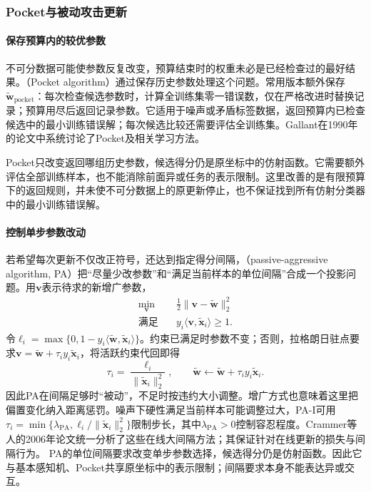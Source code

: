 \subsubsection{Pocket与被动攻击更新}

\paragraph{保存预算内的较优参数}
不可分数据可能使参数反复改变，预算结束时的权重未必是已经检查过的最好结果。（Pocket algorithm）通过保存历史参数处理这个问题。常用版本额外保存$\tilde{\bm{w}}_{\mathrm{pocket}}$：每次检查候选参数时，计算全训练集零一错误数，仅在严格改进时替换记录；预算用尽后返回记录参数。它适用于噪声或矛盾标签数据，返回预算内已检查候选中的最小训练错误解；每次候选比较还需要评估全训练集。Gallant在1990年的论文中系统讨论了Pocket及相关学习方法。

Pocket只改变返回哪组历史参数，候选得分仍是原坐标中的仿射函数。它需要额外评估全部训练样本，也不能消除前面异或任务的表示限制。这里改善的是有限预算下的返回规则，并未使不可分数据上的原更新停止，也不保证找到所有仿射分类器中的最小训练错误解。

\paragraph{控制单步参数改动}
若希望每次更新不仅改正符号，还达到指定得分间隔，（passive-aggressive algorithm, PA）把“尽量少改参数”和“满足当前样本的单位间隔”合成一个投影问题。用$\bm{v}$表示待求的新增广参数，
\begin{equation}
  \label{eq:classification-pa-projection}
  \begin{aligned}
    \min_{\bm{v}}\quad&
      \frac12\|\bm{v}-\tilde{\bm{w}}\|_2^2\\
    \text{满足}\quad&
      y_i\langle\bm{v},\tilde{\bm{x}}_i\rangle\geq1 .
  \end{aligned}
\end{equation}
令$\ell_i=\max\{0,1-y_i\langle\tilde{\bm{w}},\tilde{\bm{x}}_i\rangle\}$。约束已满足时参数不变；否则，拉格朗日驻点要求$\bm{v}=\tilde{\bm{w}}+\tau_i y_i\tilde{\bm{x}}_i$，将活跃约束代回即得
\[
  \tau_i=\frac{\ell_i}{\|\tilde{\bm{x}}_i\|_2^2},
  \qquad
  \tilde{\bm{w}}\leftarrow
    \tilde{\bm{w}}+\tau_i y_i\tilde{\bm{x}}_i .
\]
因此PA在间隔足够时“被动”，不足时按违约大小调整。增广方式也意味着这里把偏置变化纳入距离惩罚。噪声下硬性满足当前样本可能调整过大，PA-I可用$\tau_i=\min\{\lambda_{\mathrm{PA}},\ell_i/\|\tilde{\bm{x}}_i\|_2^2\}$限制步长，其中$\lambda_{\mathrm{PA}}>0$控制容忍程度。Crammer等人的2006年论文统一分析了这些在线大间隔方法；其保证针对在线更新的损失与间隔行为。
PA的单位间隔要求改变单步参数选择，候选得分仍是仿射函数。因此它与基本感知机、Pocket共享原坐标中的表示限制；间隔要求本身不能表达异或交互。

